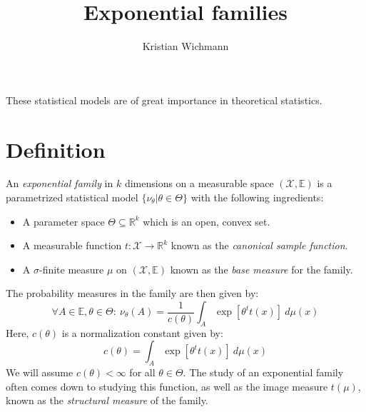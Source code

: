 \documentclass[12pt, a4paper]{article}
\title{Exponential families}
\author{Kristian Wichmann}
\numberwithin{equation}{section}
\begin{document}
\maketitle

These statistical models are of great importance in theoretical statistics.

\section{Definition}
An \textit{exponential family} in $k$ dimensions on a measurable space $(\mathcal{X},\mathbb{E})$ is a parametrized statistical model $\{\nu_\theta|\theta\in\Theta\}$ with the following ingredients:
\begin{itemize}
\item A parameter space $\Theta\subseteq\mathbb{R}^k$ which is an open, convex set.
\item A measurable function $t:\mathcal{X}\rightarrow\mathbb{R}^k$ known as the \textit{canonical sample function}.
\item A $\sigma$-finite measure $\mu$ on $(\mathcal{X},\mathbb{E})$ known as the \textit{base measure} for the family.
\end{itemize}
The probability measures in the family are then given by:
\begin{equation}
\forall A\in\mathbb{E}, \theta\in\Theta:\ \nu_\theta(A)=\frac{1}{c(\theta)}\int_A\exp\left[\theta^t t(x)\right]\ d\mu(x)
\end{equation}
Here, $c(\theta)$ is a normalization constant given by:
\begin{equation}
c(\theta)=\int_A\exp\left[\theta^t t(x)\right]\ d\mu(x)
\end{equation}
We will assume $c(\theta)<\infty$ for all $\theta\in\Theta$. The study of an exponential family often comes down to studying this function, as well as the image measure $t(\mu)$, known as the \textit{structural measure} of the family.
\end{document}
